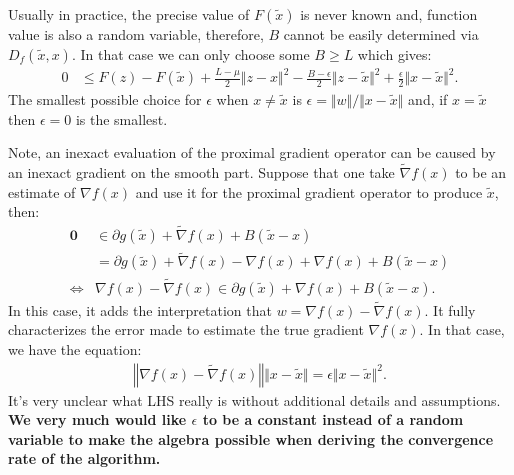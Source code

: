 \documentclass[12pt]{article}
\begin{document}
        \begin{remark}
            Usually in practice, the precise value of $F(\tilde x)$ is never known and, function value is also a random variable, therefore, $B$ cannot be easily determined via $D_f(\tilde x, x)$. 
            In that case we can only choose some $B \ge L$ which gives: 
            \begin{align*}
                0 &\le 
                F(z) - F(\tilde x) + \frac{L - \mu}{2}\Vert z - x\Vert^2
                - \frac{B - \epsilon}{2}\Vert z - \tilde x\Vert^2
                + \frac{\epsilon}{2}\Vert x - \tilde x \Vert^2.
            \end{align*}
            The smallest possible choice for $\epsilon$ when $x \neq \tilde x$ is $\epsilon = \Vert w\Vert/\Vert x - \tilde x\Vert$ and, if $x = \tilde x$ then $\epsilon = 0$ is the smallest. 
        \end{remark}
        Note, an inexact evaluation of the proximal gradient operator can be caused by an inexact gradient on the smooth part. 
        Suppose that one take $\tilde \nabla f(x)$ to be an estimate of $\nabla f(x)$ and use it for the proximal gradient operator to produce $\tilde x$, then: 
        \begin{align}
            \mathbf 0 
            &\in \partial g(\tilde x) + \tilde \nabla f(x) + B(\tilde x - x)
            \\
            &= 
            \partial g(\tilde x) + \tilde\nabla f(x) - \nabla f(x) 
            + \nabla f(x) + B(\tilde x - x)
            \\
            \iff &
            \nabla f(x) - \tilde \nabla f(x) \in 
            \partial g(\tilde x) 
            + \nabla f(x) + B(\tilde x - x).\label{eqn:stoch-grad-err-vec}
        \end{align}
        In this case, it adds the interpretation that $w = \nabla f(x) - \tilde \nabla f(x)$. 
        It fully characterizes the error made to estimate the true gradient $\nabla f(x)$. 
        In that case, we have the equation: 
        \begin{align*}
            \left\Vert \nabla f(x) - \tilde \nabla f(x) \right\Vert \Vert x - \tilde x\Vert
            = \epsilon \Vert x - \tilde x\Vert^2. 
        \end{align*}
        It's very unclear what LHS really is without additional details and assumptions. 
        \textbf{We very much would like $\epsilon$ to be a constant instead of a random variable to make the algebra possible when deriving the convergence rate of the algorithm. }
\end{document}
